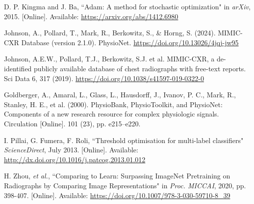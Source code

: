 \documentclass[12pt]{article}
\begin{document}
\begin{thebibliography}{99}
D. P. Kingma and J. Ba, ``Adam: A method for stochastic optimization" in \textit{arXiv}, 2015. [Online]. Available: \url{https://arxiv.org/abs/1412.6980}

Johnson, A., Pollard, T., Mark, R., Berkowitz, S., & Horng, S. (2024). MIMIC-CXR Database (version 2.1.0). PhysioNet. \url{https://doi.org/10.13026/4jqj-jw95}

Johnson, A.E.W., Pollard, T.J., Berkowitz, S.J. et al. MIMIC-CXR, a de-identified publicly available database of chest radiographs with free-text reports. Sci Data 6, 317 (2019). \url{https://doi.org/10.1038/s41597-019-0322-0}

Goldberger, A., Amaral, L., Glass, L., Hausdorff, J., Ivanov, P. C., Mark, R., Stanley, H. E., et al. (2000). PhysioBank, PhysioToolkit, and PhysioNet: Components of a new research resource for complex physiologic signals. Circulation [Online]. 101 (23), pp. e215–e220.

I. Pillai, G. Fumera, F. Roli, ``Threshold optimisation for multi-label classifiers" \textit{ScienceDirect}, July 2013. [Online]. Available: \url{http://dx.doi.org/10.1016/j.patcog.2013.01.012}

H. Zhou, \textit{et al.}, ``Comparing to Learn: Surpassing ImageNet Pretraining on Radiographs by Comparing Image Representations" in \textit{Proc. MICCAI}, 2020, pp. 398-407. [Online]. Available: \url{https://doi.org/10.1007/978-3-030-59710-8_39}

\end{thebibliography}
\end{document}

